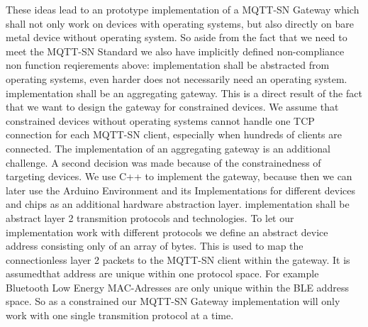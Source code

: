 These ideas lead to an prototype implementation of a MQTT-SN Gateway which shall not only work on devices with operating systems, but also directly on bare metal device without operating system.
So aside from the fact that we need to meet the MQTT-SN Standard we also have implicitly defined non-compliance non function reqierements above:
implementation shall be abstracted from operating systems, even harder does not necessarily need an operating system.
implementation shall be an aggregating gateway. This is a direct result of the fact that we want to design the gateway for constrained devices.
We assume that constrained devices without operating systems cannot handle one TCP connection for each MQTT-SN client, especially when hundreds of clients are connected.
The implementation of an aggregating gateway is an additional challenge.
A second decision was made because of the constrainedness of targeting devices.
We use C++ to implement the gateway, because then we can later use the Arduino Environment and its Implementations for different devices and chips as an additional hardware abstraction layer.
implementation shall be abstract layer 2 transmition protocols and technologies. To let our implementation work with different protocols we define an abstract device address consisting only of an array of bytes. This is used to map the connectionless layer 2 packets to the MQTT-SN client within the gateway. It is assumedthat address are unique within one protocol space. For example Bluetooth Low Energy MAC-Adresses are only unique within the BLE address space.
So as a constrained our MQTT-SN Gateway implementation will only work with one single transmition protocol at a time.


